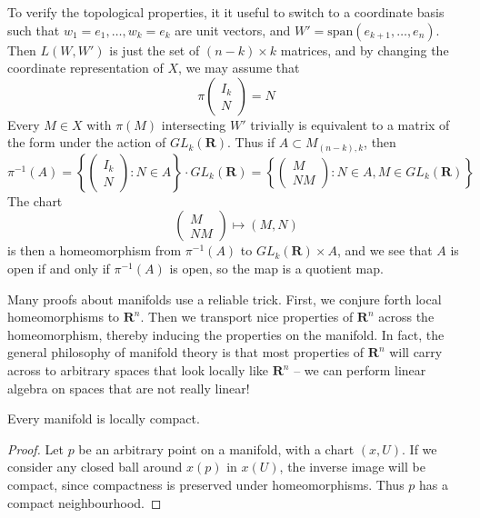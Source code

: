 \begin{example}
    To verify the topological properties, it it useful to switch to a coordinate basis such that $w_1 = e_1, \dots, w_k = e_k$ are unit vectors, and $W' = \text{span}(e_{k+1}, \dots, e_n)$. Then $L(W,W')$ is just the set of $(n-k) \times k$ matrices, and by changing the coordinate representation of $X$, we may assume that
    \[ \pi \begin{pmatrix} I_k \\ N \end{pmatrix} = N \]
    Every $M \in X$ with $\pi(M)$ intersecting $W'$ trivially is equivalent to a matrix of the form under the action of $GL_k(\mathbf{R})$. Thus if $A \subset M_{(n-k),k}$, then
    \[ \pi^{-1}(A) = \left\{ \begin{pmatrix} I_k \\ N \end{pmatrix} : N \in A \right\} \cdot GL_k(\mathbf{R}) = \left\{ \begin{pmatrix} M \\ NM \end{pmatrix} : N \in A, M \in GL_k(\mathbf{R}) \right\} \]
    The chart
    \[ \begin{pmatrix} M \\ NM \end{pmatrix} \mapsto (M, N) \]
    is then a homeomorphism from $\pi^{-1}(A)$ to $GL_k(\mathbf{R}) \times A$, and we see that $A$ is open if and only if $\pi^{-1}(A)$ is open, so the map is a quotient map.
\end{example}

Many proofs about manifolds use a reliable trick. First, we conjure forth local homeomorphisms to $\mathbf{R}^n$. Then we transport nice properties of $\mathbf{R}^n$ across the homeomorphism, thereby inducing the properties on the manifold. In fact, the general philosophy of manifold theory is that most properties of $\mathbf{R}^n$ will carry across to arbitrary spaces that look locally like $\mathbf{R}^n$ -- we can perform linear algebra on spaces that are not really linear!

\begin{theorem}
    Every manifold is locally compact.
\end{theorem}
\begin{proof}
    Let $p$ be an arbitrary point on a manifold, with a chart $(x,U)$. If we consider any closed ball around $x(p)$ in $x(U)$, the inverse image will be compact, since compactness is preserved under homeomorphisms. Thus $p$ has a compact neighbourhood.
\end{proof}

